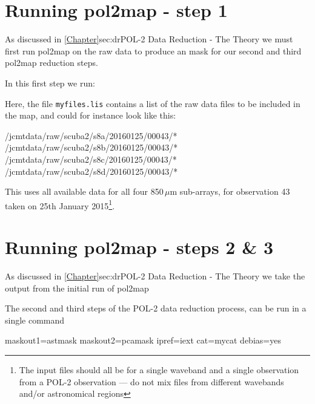 \section{Running pol2map - step 1}

As discussed in \cref{Chapter}{sec:dr}{POL-2 Data Reduction - The Theory} we must first run pol2map on the raw data to produce an mask for our second and third pol2map reduction steps.

In this first step we run:

\begin{terminalv}
\end{terminalv}

Here, the file \texttt{myfiles.lis} contains a list of the raw data
files to be included in the map, and could for instance look like this:

\begin{terminalv}
/jcmtdata/raw/scuba2/s8a/20160125/00043/*
/jcmtdata/raw/scuba2/s8b/20160125/00043/*
/jcmtdata/raw/scuba2/s8c/20160125/00043/*
/jcmtdata/raw/scuba2/s8d/20160125/00043/*
\end{terminalv}

This uses all available data for all four 850\,$\mu$m sub-arrays, for
observation 43 taken on 25th January 2015\footnote{The input files should all be
for a single waveband and a single observation from a POL-2 observation --- do not mix files from
different wavebands and/or astronomical regions}.

\section{Running pol2map - steps 2 \& 3}


As discussed in \cref{Chapter}{sec:dr}{POL-2 Data Reduction - The Theory} we take the output from the initial run of pol2map  

The second and third steps of the POL-2 data reduction process,  can be run in a single command

\begin{terminalv}
          maskout1=astmask maskout2=pcamask ipref=iext cat=mycat debias=yes
\end{terminalv}


\begin{terminalv}
%
\end{terminalv}


\begin{terminalv}
%
\end{terminalv}

